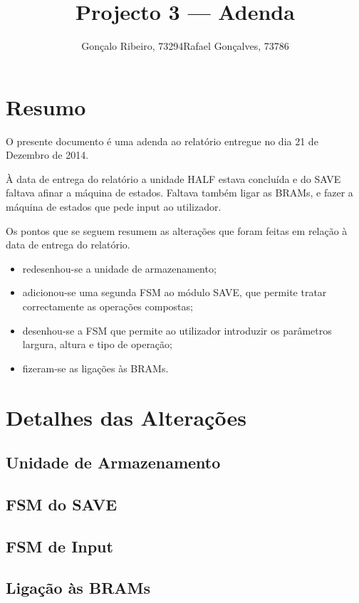 \documentclass[a4paper]{article}
\title{Projecto 3 --- Adenda}
\author{Gonçalo Ribeiro, 73294\hspace{8mm}Rafael Gonçalves, 73786}
\begin{document}
\maketitle
%


\section{Resumo}
O presente documento é uma adenda ao relatório entregue no dia 21 de Dezembro de 2014.

À data de entrega do relatório a unidade HALF estava concluída e do SAVE faltava afinar a máquina de estados. Faltava também ligar as BRAMs, e fazer a máquina de estados que pede input ao utilizador.

Os pontos que se seguem resumem as alterações que foram feitas em relação à data de entrega do relatório.

\begin{itemize}
	\item redesenhou-se a unidade de armazenamento;
	\item adicionou-se uma segunda FSM ao módulo SAVE, que permite tratar correctamente as operações compostas;
	\item desenhou-se a FSM que permite ao utilizador introduzir os parâmetros largura, altura e tipo de operação;
	\item fizeram-se as ligações às BRAMs.
\end{itemize}

\section{Detalhes das Alterações}

\subsection*{Unidade de Armazenamento}

\subsection*{FSM do SAVE}

\subsection*{FSM de Input}

\subsection*{Ligação às BRAMs}
\end{document}
